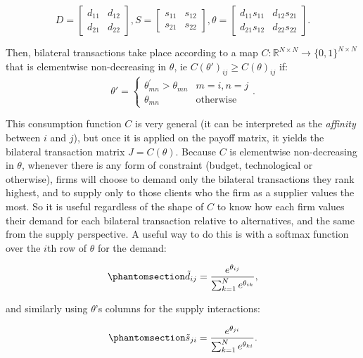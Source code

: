 \documentclass[
]{article}
\theoremstyle{definition}
\theoremstyle{plain}
\theoremstyle{remark}
\begin{document}
\[
D = 
\begin{bmatrix}
d_{11} & d_{12} \\
d_{21} & d_{22}
\end{bmatrix}
,
S = 
\begin{bmatrix}
s_{11} & s_{12} \\
s_{21} & s_{22}
\end{bmatrix}
,
\theta = 
\begin{bmatrix}
d_{11}s_{11} & d_{12}s_{21} \\
d_{21}s_{12} & d_{22}s_{22}
\end{bmatrix}.
\]

Then, bilateral transactions take place according to a map
\(C : \mathbb{R}^{N \times N} \to \{0, 1\}^{N \times N}\) that is
elementwise non-decreasing in \(\theta\), ie
\(C(\theta')_{ij} \geq C(\theta)_{ij}\) if: \[
\theta' = \begin{cases} \theta_{mn}^{'} > \theta_{mn} & m=i, n=j\\ \theta_{mn} & \text{otherwise} \end{cases}.
\]

This consumption function \(C\) is very general (it can be interpreted
as the \emph{affinity} between \(i\) and \(j\)), but once it is applied
on the payoff matrix, it yields the bilateral transaction matrix
\(J = C(\theta)\). Because \(C\) is elementwise non-decreasing in
\(\theta\), whenever there is any form of constraint (budget,
technological or otherwise), firms will choose to demand only the
bilateral transactions they rank highest, and to supply only to those
clients who the firm as a supplier values the most. So it is useful
regardless of the shape of \(C\) to know how each firm values their
demand for each bilateral transaction relative to alternatives, and the
same from the supply perspective. A useful way to do this is with a
softmax function over the \(i\)th row of \(\theta\) for the demand:

\begin{equation}\phantomsection\label{eq-softmaxrow}{
\tilde{d}_{ij} = \frac{e^{\theta_{ij}}}{\sum_{k=1}^N e^{\theta_{ik}}},
}\end{equation}

and similarly using \(\theta\)'s columns for the supply interactions:

\begin{equation}\phantomsection\label{eq-softmaxcol}{
\tilde{s}_{ji} = \frac{e^{\theta_{ji}}}{\sum_{k=1}^N e^{\theta_{ki}}}.
}\end{equation}
\end{document}
